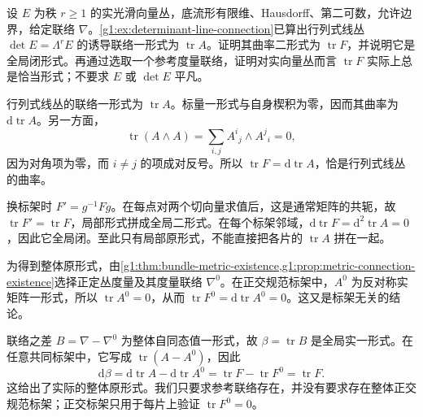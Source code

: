 \begin{exercise}\label{g1:ex:determinant-connection-curvature}
	设 \(E\) 为秩 \(r\ge1\) 的实光滑向量丛，底流形有限维、Hausdorff、第二可数，允许边界，给定联络 \(\nabla\)。\cref{g1:ex:determinant-line-connection}已算出行列式线丛 \(\det E=\Lambda^rE\) 的诱导联络一形式为 \(\operatorname{tr}A\)。证明其曲率二形式为 \(\operatorname{tr}F\)，并说明它是全局闭形式。再通过选取一个参考度量联络，证明对实向量丛而言 \(\operatorname{tr}F\) 实际上总是恰当形式；不要求 \(E\) 或 \(\det E\) 平凡。
\end{exercise}
\begin{solution}
	行列式线丛的联络一形式为 \(\operatorname{tr}A\)。标量一形式与自身楔积为零，因而其曲率为 \(\mathrm{d}\operatorname{tr}A\)。另一方面，
	\[
		\operatorname{tr}(A\wedge A)=\sum_{i,j}A^i{}_j\wedge A^j{}_i=0,
	\]
	因为对角项为零，而 \(i\ne j\) 的项成对反号。所以 \(\operatorname{tr}F=\mathrm{d}\operatorname{tr}A\)，恰是行列式线丛的曲率。

	换标架时 \(F'=g^{-1}Fg\)。在每点对两个切向量求值后，这是通常矩阵的共轭，故 \(\operatorname{tr}F'=\operatorname{tr}F\)，局部形式拼成全局二形式。在每个标架邻域，\(\mathrm{d}\operatorname{tr}F=\mathrm{d}^2\operatorname{tr}A=0\)，因此它全局闭。至此只有局部原形式，不能直接把各片的 \(\operatorname{tr}A\) 拼在一起。

	为得到整体原形式，由\cref{g1:thm:bundle-metric-existence,g1:prop:metric-connection-existence}选择正定丛度量及其度量联络 \(\nabla^0\)。在正交规范标架中，\(A^0\) 为反对称实矩阵一形式，所以 \(\operatorname{tr}A^0=0\)，从而 \(\operatorname{tr}F^0=\mathrm{d}\operatorname{tr}A^0=0\)。这又是标架无关的结论。

	联络之差 \(B=\nabla-\nabla^0\) 为整体自同态值一形式，故 \(\beta=\operatorname{tr}B\) 是全局实一形式。在任意共同标架中，它写成 \(\operatorname{tr}(A-A^0)\)，因此
	\[
		\mathrm{d}\beta=\mathrm{d}\operatorname{tr}A-\mathrm{d}\operatorname{tr}A^0
		=\operatorname{tr}F-\operatorname{tr}F^0=\operatorname{tr}F.
	\]
	这给出了实际的整体原形式。我们只要求参考联络存在，并没有要求存在整体正交规范标架；正交标架只用于每片上验证 \(\operatorname{tr}F^0=0\)。
\end{solution}

